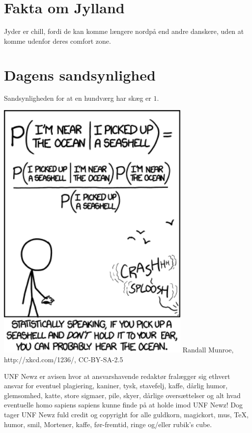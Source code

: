 \begin{minipage}[b]{0.95\linewidth}
\begin{minipage}[t]{0.47\textwidth}
\vspace{-2mm}
\section*{Fakta om Jylland}
Jyder er chill, fordi de kan komme længere nordpå end andre danskere, uden at komme udenfor deres comfort zone.

\vspace{-2mm}
\section*{Dagens sandsynlighed}
Sandsynligheden for at en hundværg har skæg er $1$.

\vspace{1mm}
\includegraphics[width=95mm]{seashell.png}
\tiny Randall Munroe, http://xkcd.com/1236/, CC-BY-SA-2.5
\end{minipage}

\begin{center}
\tiny UNF Newz er avisen hvor at ansvarshavende redaktør fralægger sig ethvert ansvar for eventuel plagiering, kaniner, tysk, stavefelj, kaffe, dårlig humor, glemsomhed, katte, store sigmaer, pile, skyer, dårlige oversættelser og alt hvad eventuelle homo sapiens sapiens kunne finde på at holde imod UNF Newz! Dog tager UNF Newz fuld credit og copyright for alle guldkorn, magickort, mus, \TeX, humor, smil, Mortener, kaffe, før-fremtid, ringe og/eller rubik's cube.
\end{center}
\end{minipage}

